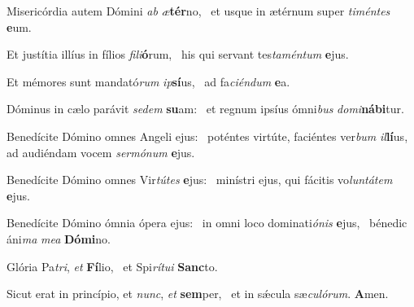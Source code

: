 \item Misericórdia autem Dómini \textit{ab} \textit{æ}\textbf{tér}no,~\psstar{} et usque in ætérnum super \textit{timéntes} \textbf{e}um.
\item Et justítia illíus in fílios \textit{fili}\textbf{ó}rum,~\psstar{} his qui servant tes\textit{taméntum} \textbf{e}jus.
\item Et mémores sunt mandató\textit{rum} \textit{ip}\textbf{sí}us,~\psstar{} ad fa\textit{ciéndum} \textbf{e}a.
\item Dóminus in cælo parávit \textit{sedem} \textbf{su}am:~\psstar{} et regnum ipsíus ómni\textit{bus} \textit{domi}\textbf{ná}\textbf{bi}tur.
\item Benedícite Dómino omnes Angeli ejus:~\pscross{} poténtes virtúte, faciéntes ver\textit{bum} \textit{il}\textbf{lí}us,~\psstar{} ad audiéndam vocem \textit{sermónum} \textbf{e}jus.
\item Benedícite Dómino omnes Vir\textit{tútes} \textbf{e}jus:~\psstar{} minístri ejus, qui fácitis vo\textit{luntátem} \textbf{e}jus.
\item Benedícite Dómino ómnia ópera ejus:~\pscross{} in omni loco dominati\textit{ónis} \textbf{e}jus,~\psstar{} bénedic áni\textit{ma} \textit{mea} \textbf{Dó}\textbf{mi}no.
\item Glória Pa\textit{tri}, \textit{et} \textbf{Fí}lio,~\psstar{} et Spi\textit{rítui} \textbf{Sanc}to.
\item Sicut erat in princípio, et \textit{nunc}, \textit{et} \textbf{sem}per,~\psstar{} et in sǽcula sæ\textit{culórum}. \textbf{A}men.
